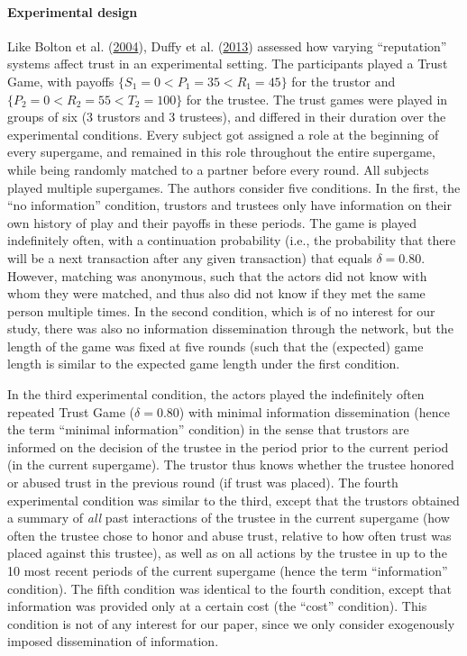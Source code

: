 \documentclass[
  11pt,
]{article}
\begin{document}
\hypertarget{experimental-design-1}{%
\paragraph{Experimental design}\label{experimental-design-1}}

Like Bolton et al. (\protect\hyperlink{ref-bolton_electronic_2004}{2004}), Duffy et al. (\protect\hyperlink{ref-duffy2013social}{2013}) assessed how varying ``reputation'' systems affect trust in an experimental setting. The participants played a Trust Game, with payoffs \(\{S_1 = 0 < P_1 = 35 < R_1 = 45\}\) for the trustor and \(\{P_2 = 0 < R_2 = 55 < T_2 = 100\}\) for the trustee. The trust games were played in groups of six (3 trustors and 3 trustees), and differed in their duration over the experimental conditions. Every subject got assigned a role at the beginning of every supergame, and remained in this role throughout the entire supergame, while being randomly matched to a partner before every round. All subjects played multiple supergames. The authors consider five conditions.
In the first, the ``no information'' condition, trustors and trustees only have information on their own history of play and their payoffs in these periods. The game is played indefinitely often, with a continuation probability (i.e., the probability that there will be a next transaction after any given transaction) that equals \(\delta = 0.80\). However, matching was anonymous, such that the actors did not know with whom they were matched, and thus also did not know if they met the same person multiple times. In the second condition, which is of no interest for our study, there was also no information dissemination through the network, but the length of the game was fixed at five rounds (such that the (expected) game length is similar to the expected game length under the first condition.

In the third experimental condition, the actors played the indefinitely often repeated Trust Game (\(\delta = 0.80\)) with minimal information dissemination (hence the term ``minimal information'' condition) in the sense that trustors are informed on the decision of the trustee in the period prior to the current period (in the current supergame). The trustor thus knows whether the trustee honored or abused trust in the previous round (if trust was placed). The fourth experimental condition was similar to the third, except that the trustors obtained a summary of \emph{all} past interactions of the trustee in the current supergame (how often the trustee chose to honor and abuse trust, relative to how often trust was placed against this trustee), as well as on all actions by the trustee in up to the 10 most recent periods of the current supergame (hence the term ``information'' condition).
The fifth condition was identical to the fourth condition, except that information was provided only at a certain cost (the ``cost'' condition).
This condition is not of any interest for our paper, since we only consider exogenously imposed dissemination of information.
\end{document}
